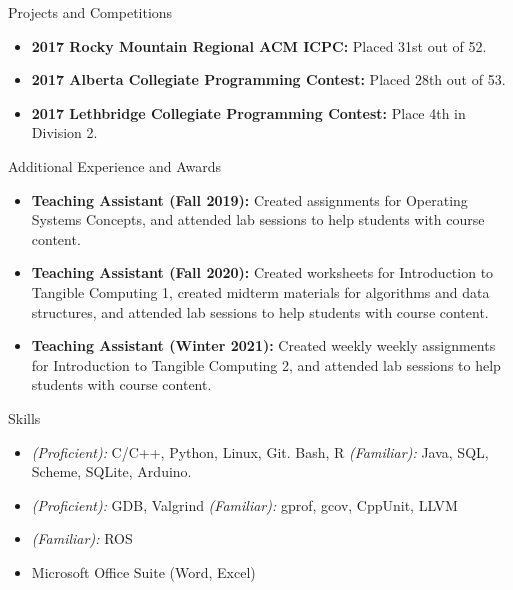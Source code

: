 \documentclass[]{mcdowellcv}
\begin{document}
\vspace*{-10pt}

\begin{cvsection}{Projects and Competitions}
  \begin{cvsubsection}{}{}{}
    \begin{itemize}
      \item \textbf{2017 Rocky Mountain Regional ACM ICPC:} Placed 31st out of 52.
      \item \textbf{2017 Alberta Collegiate Programming Contest:} Placed 28th out of 53.
      \item \textbf{2017 Lethbridge Collegiate Programming Contest:} Place 4th in Division 2.
    \end{itemize}
  \end{cvsubsection}
\end{cvsection}

\vspace*{-10pt}

\begin{cvsection}{Additional Experience and Awards}
  \begin{cvsubsection}{}{}{}	
    \begin{itemize}
      \item \textbf{Teaching Assistant (Fall 2019):} Created assignments for Operating Systems Concepts, and attended lab sessions to help students with course content.
      \item \textbf{Teaching Assistant (Fall 2020):} Created worksheets for Introduction to Tangible Computing 1, created midterm materials for algorithms and data structures, and attended lab sessions to help students with course content.
      \item \textbf{Teaching Assistant (Winter 2021):} Created weekly weekly assignments for Introduction to Tangible Computing 2, and attended lab sessions to help students with course content.
    \end{itemize}
  \end{cvsubsection}
\end{cvsection}

\vspace*{-10pt}

\begin{cvsection}{Skills}
  \begin{cvsubsection}{}{}{}	
    \begin{itemize}
      \item \emph{(Proficient):} C/C++, Python, Linux, Git. Bash, R  
            \emph{(Familiar):} Java, SQL, Scheme, SQLite, Arduino.
      \item \emph{(Proficient):} GDB, Valgrind
            \emph{(Familiar):} gprof, gcov, CppUnit, LLVM
      \item \emph{(Familiar):} ROS      
      \item Microsoft Office Suite (Word, Excel)
    \end{itemize}
  \end{cvsubsection}
\end{cvsection}
\end{document}
